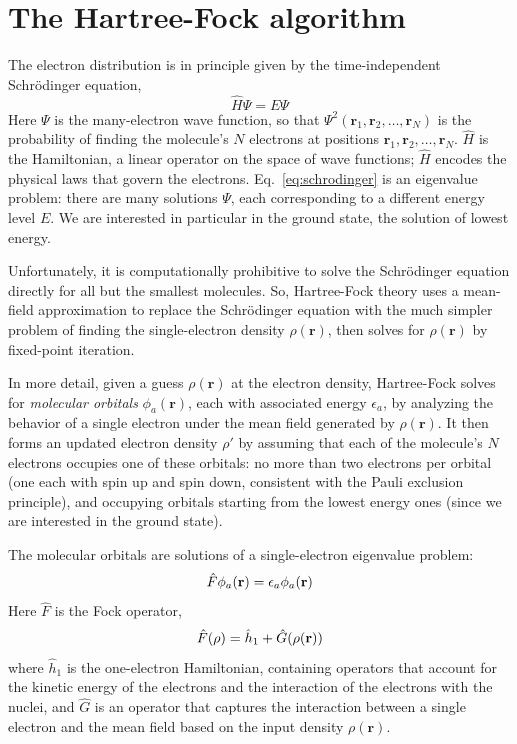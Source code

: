 \documentclass[twoside,11pt]{article}
\begin{document}


\clearpage
\appendix
\section{The Hartree-Fock algorithm}
\label{app:hf}


The electron distribution is in principle given by the time-independent Schr\"{o}dinger equation, 
\begin{equation} \label{eq:schrodinger}
				\hat{H}\Psi = E\Psi
\end{equation}
Here $\Psi$ is the many-electron wave function, so that $\Psi^2(\mathbf r_1, \mathbf r_2, \ldots, \mathbf r_N)$ is the probability of finding the molecule's $N$ electrons at positions $\mathbf r_1, \mathbf r_2, \ldots, \mathbf r_N$. $\hat{H}$ is the Hamiltonian, a linear operator on the space of wave functions; $\hat H$ encodes the physical laws that govern the electrons.  Eq.~\ref{eq:schrodinger} is an eigenvalue problem: there are many solutions $\Psi$, each corresponding to a different energy level $E$.  We are interested in particular in the ground state, the solution of lowest energy.

Unfortunately, it is computationally prohibitive to solve the Schr\"odinger equation directly for all but the smallest molecules.  So, Hartree-Fock theory uses a mean-field approximation to replace the Schr\"odinger equation with the much simpler problem of finding the single-electron density $\rho(\mathbf r)$, then solves for $\rho(\mathbf r)$ by fixed-point iteration.  

In more detail, given a guess $\rho(\mathbf r)$ at the electron density, Hartree-Fock solves for \emph{molecular orbitals} $\phi_a(\mathbf r)$, each with associated energy $\epsilon_a$, by analyzing the behavior of a single electron under the mean field generated by $\rho(\mathbf r)$.  It then forms an updated electron density $\rho'$ by assuming that each of the molecule's $N$ electrons occupies one of these orbitals: no more than two electrons per orbital (one each with spin up and spin down, consistent with the Pauli exclusion principle), and occupying orbitals starting from the lowest energy ones (since we are interested in the ground state).

The molecular orbitals are solutions of a single-electron eigenvalue problem:
\begin{equation} \label{eq:fockSchrodinger}
				\hat{F}\phi_a({\bf r}) = \epsilon_a \phi_a({\bf r})
\end{equation}
Here $\hat F$ is the Fock operator, 
\begin{equation} \label{eq:fock}
\hat{F}(\rho) = \hat{h}_1 + \hat{G}(\rho({\bf r}))
\end{equation}
where $\hat{h}_1$ is the one-electron Hamiltonian, containing operators that account for the kinetic energy of the electrons and the interaction of the electrons with the nuclei, and $\hat{G}$ is an operator that captures the interaction between a single electron and the mean field based on the input density $\rho(\mathbf r)$.
\end{document}
